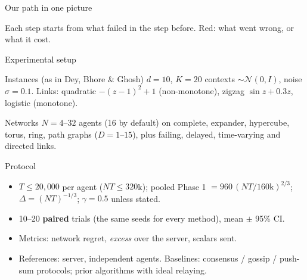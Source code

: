 \documentclass[11pt]{beamer}
\begin{document}
\begin{frame}{Our path in one picture}
\centering
{}
\vspace{0.6em}

\small Each step starts from what failed in the step before. \textcolor{red!70!black}{Red: what went wrong, or what it cost.}
\end{frame}

\begin{frame}{Experimental setup}
\footnotesize
\begin{block}{Instances (as in Dey, Bhore \& Ghosh)}
$d=10$, $K=20$ contexts $\sim\mathcal N(0,I)$, noise $\sigma=0.1$. Links: quadratic $-(z-1)^2+1$ (non-monotone), zigzag $\sin z+0.3z$, logistic (monotone).
\end{block}
\begin{block}{Networks}
$N=4$--$32$ agents (16 by default) on complete, expander, hypercube, torus, ring, path graphs ($D=1$--$15$), plus failing, delayed, time-varying and directed links.
\end{block}
\begin{block}{Protocol}
\begin{itemize}
\item $T\le20{,}000$ per agent ($NT\le320$k); pooled Phase 1 $=960\,(NT/160\text{k})^{2/3}$; $\Delta=(NT)^{-1/3}$; $\gamma=0.5$ unless stated.
\item 10--20 \textbf{paired} trials (the same seeds for every method), mean $\pm$ 95\% CI.
\item Metrics: network regret, \emph{excess} over the server, scalars sent.
\item References: server, independent agents. Baselines: consensus / gossip / push-sum protocols; prior algorithms with ideal relaying.
\end{itemize}
\end{block}
\end{frame}
\end{document}
